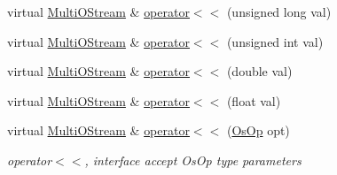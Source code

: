 \begin{DoxyCompactItemize}
virtual \hyperlink{classHSF_1_1MultiOStream}{MultiOStream} \& \hyperlink{classHSF_1_1MultiOStream_a40a0605bc99045578fccf9c5413411f5}{operator$<$$<$} (unsigned long val)
\item 
virtual \hyperlink{classHSF_1_1MultiOStream}{MultiOStream} \& \hyperlink{classHSF_1_1MultiOStream_a62badc16d7c2ac1ec092032698202938}{operator$<$$<$} (unsigned int val)
\item 
virtual \hyperlink{classHSF_1_1MultiOStream}{MultiOStream} \& \hyperlink{classHSF_1_1MultiOStream_a5655da107161e680d3ae6eadb35e6617}{operator$<$$<$} (double val)
\item 
virtual \hyperlink{classHSF_1_1MultiOStream}{MultiOStream} \& \hyperlink{classHSF_1_1MultiOStream_ac926ea2605959066ab85c45a58dfa229}{operator$<$$<$} (float val)
\item 
virtual \hyperlink{classHSF_1_1MultiOStream}{MultiOStream} \& \hyperlink{classHSF_1_1MultiOStream_a31d1b48c4c7aac4ec51352f4dad28c8a}{operator$<$$<$} (\hyperlink{namespaceHSF_a5c97750573f23c09a9fed0efa5baa52d}{OsOp} opt)
\begin{DoxyCompactList}\small\item\em operator$<$$<$, interface accept OsOp type parameters \item\end{DoxyCompactList}\end{DoxyCompactItemize}


